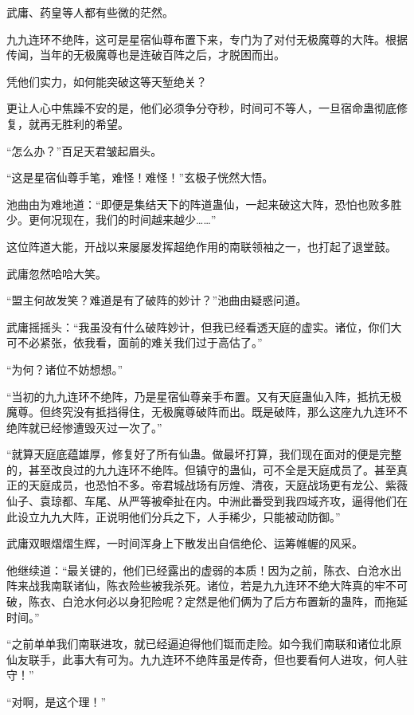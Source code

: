 
\begin{this_body}

武庸、药皇等人都有些微的茫然。

九九连环不绝阵，这可是星宿仙尊布置下来，专门为了对付无极魔尊的大阵。根据传闻，当年的无极魔尊也是连破百阵之后，才脱困而出。

凭他们实力，如何能突破这等天堑绝关？

更让人心中焦躁不安的是，他们必须争分夺秒，时间可不等人，一旦宿命蛊彻底修复，就再无胜利的希望。

“怎么办？”百足天君皱起眉头。

“这是星宿仙尊手笔，难怪！难怪！”玄极子恍然大悟。

池曲由为难地道：“即便是集结天下的阵道蛊仙，一起来破这大阵，恐怕也败多胜少。更何况现在，我们的时间越来越少……”

这位阵道大能，开战以来屡屡发挥超绝作用的南联领袖之一，也打起了退堂鼓。

武庸忽然哈哈大笑。

“盟主何故发笑？难道是有了破阵的妙计？”池曲由疑惑问道。

武庸摇摇头：“我虽没有什么破阵妙计，但我已经看透天庭的虚实。诸位，你们大可不必紧张，依我看，面前的难关我们过于高估了。”

“为何？诸位不妨想想。”

“当初的九九连环不绝阵，乃是星宿仙尊亲手布置。又有天庭蛊仙入阵，抵抗无极魔尊。但终究没有抵挡得住，无极魔尊破阵而出。既是破阵，那么这座九九连环不绝阵就已经惨遭毁灭过一次了。”

“就算天庭底蕴雄厚，修复好了所有仙蛊。做最坏打算，我们现在面对的便是完整的，甚至改良过的九九连环不绝阵。但镇守的蛊仙，可不全是天庭成员了。甚至真正的天庭成员，也恐怕不多。帝君城战场有厉煌、清夜，天庭战场更有龙公、紫薇仙子、袁琼都、车尾、从严等被牵扯在内。中洲此番受到我四域齐攻，逼得他们在此设立九九大阵，正说明他们分兵之下，人手稀少，只能被动防御。”

武庸双眼熠熠生辉，一时间浑身上下散发出自信绝伦、运筹帷幄的风采。

他继续道：“最关键的，他们已经露出的虚弱的本质！因为之前，陈衣、白沧水出阵来战我南联诸仙，陈衣险些被我杀死。诸位，若是九九连环不绝大阵真的牢不可破，陈衣、白沧水何必以身犯险呢？定然是他们俩为了后方布置新的蛊阵，而拖延时间。”

“之前单单我们南联进攻，就已经逼迫得他们铤而走险。如今我们南联和诸位北原仙友联手，此事大有可为。九九连环不绝阵虽是传奇，但也要看何人进攻，何人驻守！”

“对啊，是这个理！”


\end{this_body}
